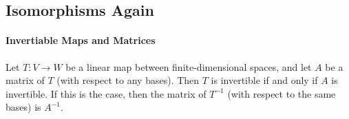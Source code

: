 \subsection{Isomorphisms Again}
\paragraph{Invertiable Maps and Matrices}
Let \(T: V \to W\) be a linear map between finite-dimensional spaces, and let \(A\) be a matrix of \(T\) (with respect to any bases). Then \(T\) is invertible if and only if \(A\) is invertible. If this is the case, then the matrix of \(T^{-1}\) (with respect to the same bases) is \(A^{-1}\).